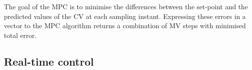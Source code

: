 The goal of the MPC is to minimise the differences between the set-point and the predicted values of the CV at each sampling instant. Expressing these errors in a vector to the MPC algorithm returns a combination of MV steps with minimised total error. 


\subsection{Real-time control}